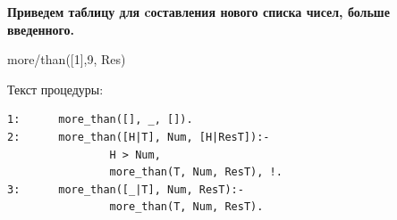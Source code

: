 \documentclass[12pt, a4paper]{extarticle}
\begin{document}
\begin{figure}[h!]
	\begin{minipage}[h]{0.48\linewidth}
	\end{minipage}
	\hfill
	\begin{minipage}[h]{0.48\linewidth}
	\end{minipage}
\end{figure}\par

\newpage
\textbf{Приведем таблицу для cоставления нового списка чисел, больше введенного. }\par
more/than([1],9, Res)\par
Текст процедуры:
\begin{lstlisting}
1:		more_than([], _, []).
2:		more_than([H|T], Num, [H|ResT]):-
				H > Num,
				more_than(T, Num, ResT), !.
3:		more_than([_|T], Num, ResT):-
				more_than(T, Num, ResT).
\end{lstlisting}\par
\end{document}
